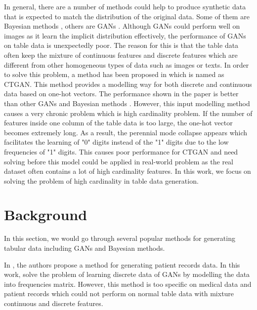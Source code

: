 \documentclass{article}
\begin{document}
In general, there are a number of methods could help to produce synthetic data that is expected to match the distribution of the original data. Some of them are Bayesian methods \cite{chow1968approximating} \cite{zhang2017privbayes}, others are \ac{GANs} \cite{choi2017generating} \cite{srivastava2017veegan} \cite{park2018data}. Although \ac{GANs} could perform well on images as it learn the implicit distribution effectively, the performance of \ac{GANs} on table data is unexpectedly poor. The reason for this is that the table data often keep the mixture of continuous features and discrete features which are different from other homogeneous types of data such as images or texts. In order to solve this problem, a method has been proposed in \cite{xu2019modeling} which is named as \ac{CTGAN}. This method provides a modelling way for both discrete and continuous data based on one-hot vectors. The performance shown in the paper \cite{xu2019modeling} is better than other \ac{GANs} \cite{choi2017generating} \cite{srivastava2017veegan} \cite{park2018data} and Bayesian methods \cite{chow1968approximating} \cite{zhang2017privbayes}. However, this input modelling method causes a very chronic problem which is high cardinality problem. If the number of features inside one column of the table data is too large, the one-hot vector becomes extremely long. As a result, the perennial mode collapse appears which facilitates the learning of "0" digits instead of the "1" digits due to the low frequencies of "1" digits. This causes poor performance for \ac{CTGAN} and need solving before this model could be applied in real-world problem as the real dataset often contains a lot of high cardinality features. In this work, we focus on solving the problem of high cardinality in table data generation. 

\section{Background}

In this section, we would go through several popular methods for generating tabular data including \ac{GANs} and Bayesian methods. 

 In \cite{choi2017generating}, the authors propose a method for generating patient records data. In this work, \citeauthor{choi2017generating} solve the problem of learning discrete data of \ac{GANs} by modelling the data into frequencies matrix. However, this method is too specific on medical data and patient records which could not perform on normal table data with mixture continuous and discrete features.  
\end{document}
